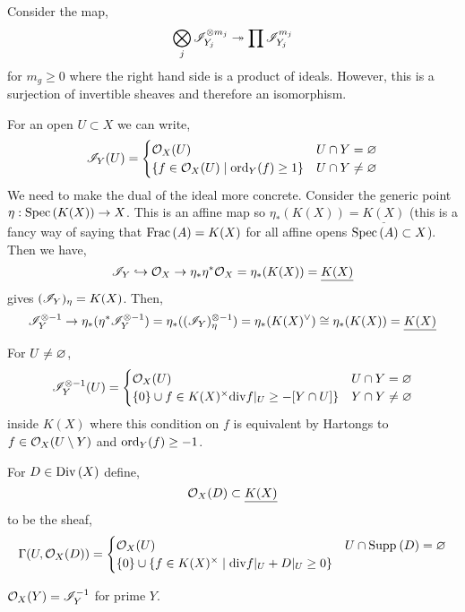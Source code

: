 \documentclass[12pt]{article}
\begin{document}
\begin{rmk}
Consider the map,
\[ \bigotimes_j \mathscr{I}_{Y_j}^{\otimes m_j} \twoheadrightarrow \prod \mathscr{I}_{Y_j}^{m_j} \]
for $m_g \ge 0$ where the right hand side is a product of ideals. However, this is a surjection of invertible sheaves and therefore an isomorphism.  
\end{rmk} 

\begin{rmk}
For an open $U \subset X$ we can write,
\[ \mathscr{I}_Y(U) = 
\begin{cases}
\mathcal{O}_{X}(U) & U \cap Y = \varnothing 
\\
\{ f \in \mathcal{O}_{X}(U) \mid \operatorname{\mathrm{ord}}_{Y}(f) \ge 1 \} & U \cap Y \neq \varnothing 
\end{cases} \]
We need to make the dual of the ideal more concrete. Consider the generic point $\eta : \mathrm{Spec}\left( K(X) \right) \to X$. This is an affine map so $\eta_* (K(X)) = \underline{K(X)}$ (this is a fancy way of saying that $\mathrm{Frac}\left(A\right) = K(X)$ for all affine opens $\mathrm{Spec}\left( A \right) \subset X$). Then we have,
\[ \mathscr{I}_Y \hookrightarrow \mathcal{O}_{X} \to \eta_* \eta^* \mathcal{O}_{X} = \eta_* (K(X)) = \underline{K(X)} \]
gives $(\mathscr{I}_Y)_{\eta} = K(X)$. Then,
\[ \mathscr{I}_Y^{\otimes -1} \to \eta_* (\eta^* \mathscr{I}_Y^{\otimes -1}) = \eta_* ((\mathscr{I}_Y)_{\eta}^{\otimes -1}) = \eta_*(K(X)^\vee) \cong \eta_*(K(X)) = \underline{K(X)} \]
\end{rmk}

\begin{prop}
For $U \neq \varnothing$,
\[ \mathscr{I}_Y^{\otimes -1}(U) = 
\begin{cases}
\mathcal{O}_{X}(U) & U \cap Y = \varnothing 
\\
\{ 0 \} \cup f \in K(X)^\times \mathrm{div}{f}|_U \ge - [Y \cap U] \} & Y \cap Y \neq \varnothing 
\end{cases} \]
inside $K(X)$ where this condition on $f$ is equivalent by Hartongs to $f \in \mathcal{O}_{X}(U \setminus Y)$ and $\operatorname{\mathrm{ord}}_Y(f) \ge -1$.
\end{prop}

\begin{defn}
For $D \in \mathrm{Div}\left( X \right)$ define,
\[ \mathcal{O}_{X}(D) \subset \underline{K(X)} \]
to be the sheaf,
\[ \Gamma(U, \mathcal{O}_{X}(D)) = \begin{cases}
\mathcal{O}_{X}(U) & U \cap \mathrm{Supp}_{} \left( D \right) = \varnothing 
\\
\{ 0 \} \cup \{ f \in K(X)^\times \mid \mathrm{div}{f} |_U + D |_U \ge 0 \} 
\end{cases} \]
\end{defn} 

\begin{example}
$\mathcal{O}_{X}(Y) = \mathscr{I}_Y^{-1}$ for prime $Y$.
\end{example}
\end{document}
